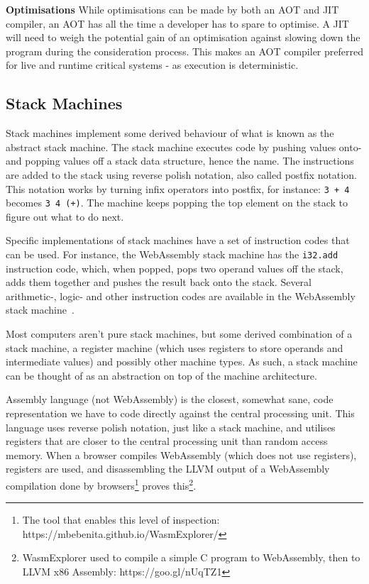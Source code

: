 \documentclass[a4paper]{article}
\begin{document}
\noindent \textbf{Optimisations} While optimisations can be made by both an AOT and JIT compiler, an AOT has all the time a developer has to spare to optimise. A JIT will need to weigh the potential gain of an optimisation against slowing down the program during the consideration process. This makes an AOT compiler preferred for live and runtime critical systems - as execution is deterministic.

\subsection{Stack Machines}
\label{sec:problem-analysis:stack-machines}
Stack machines implement some derived behaviour of what is known as the abstract stack machine. The stack machine executes code by pushing values onto- and popping values off a stack data structure, hence the name. The instructions are added to the stack using reverse polish notation, also called postfix notation. This notation works by turning infix operators into postfix, for instance: \texttt{3 + 4} becomes \texttt{3 4 (+)}. The machine keeps popping the top element on the stack to figure out what to do next.

Specific implementations of stack machines have a set of instruction codes that can be used. For instance, the WebAssembly stack machine has the \texttt{i32.add} instruction code, which, when popped, pops two operand values off the stack, adds them together and pushes the result back onto the stack. Several arithmetic-, logic- and other instruction codes are available in the WebAssembly stack machine~\cite{website:wasm-binary-encoding}.

Most computers aren't pure stack machines, but some derived combination of a stack machine, a register machine (which uses registers to store operands and intermediate values) and possibly other machine types. As such, a stack machine can be thought of as an abstraction on top of the machine architecture.

Assembly language (not WebAssembly) is the closest, somewhat sane, code representation we have to code directly against the central processing unit. This language uses reverse polish notation, just like a stack machine, and utilises registers that are closer to the central processing unit than random access memory. When a browser compiles WebAssembly (which does not use registers), registers are used, and disassembling the LLVM output of a WebAssembly compilation done by browsers\footnote{The tool that enables this level of inspection: https://mbebenita.github.io/WasmExplorer/} proves this\footnote{WasmExplorer used to compile a simple C program to WebAssembly, then to LLVM x86 Assembly: https://goo.gl/nUqTZ1}.
\end{document}
